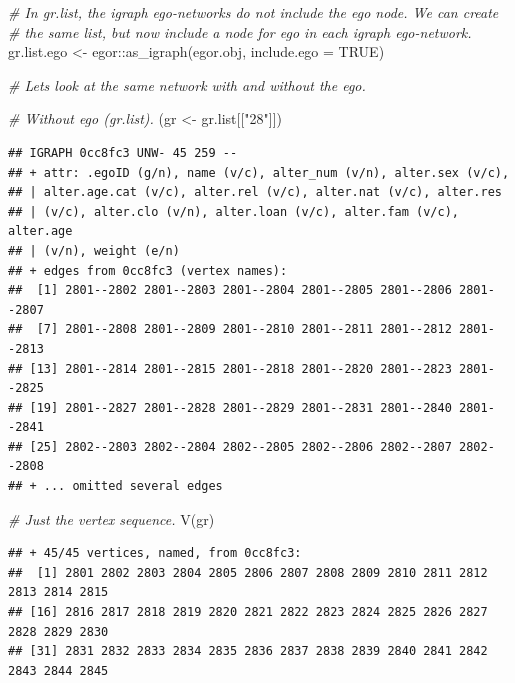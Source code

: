 \documentclass[
]{book}
\newenvironment{Shaded}{\begin{snugshade}}{\end{snugshade}}
\newcommand{\AttributeTok}[1]{\textcolor[rgb]{0.77,0.63,0.00}{#1}}
\newcommand{\CommentTok}[1]{\textcolor[rgb]{0.56,0.35,0.01}{\textit{#1}}}
\newcommand{\ConstantTok}[1]{\textcolor[rgb]{0.00,0.00,0.00}{#1}}
\newcommand{\FunctionTok}[1]{\textcolor[rgb]{0.00,0.00,0.00}{#1}}
\newcommand{\NormalTok}[1]{#1}
\newcommand{\OtherTok}[1]{\textcolor[rgb]{0.56,0.35,0.01}{#1}}
\newcommand{\SpecialCharTok}[1]{\textcolor[rgb]{0.00,0.00,0.00}{#1}}
\newcommand{\StringTok}[1]{\textcolor[rgb]{0.31,0.60,0.02}{#1}}
\begin{document}
\begin{Shaded}
\begin{Highlighting}[]
\CommentTok{\# In gr.list, the igraph ego{-}networks do not include the ego node. We can create}
\CommentTok{\# the same list, but now include a node for ego in each igraph ego{-}network.}
\NormalTok{gr.list.ego }\OtherTok{\textless{}{-}}\NormalTok{ egor}\SpecialCharTok{::}\FunctionTok{as\_igraph}\NormalTok{(egor.obj, }\AttributeTok{include.ego =} \ConstantTok{TRUE}\NormalTok{)}

\CommentTok{\# Let\textquotesingle{}s look at the same network with and without the ego.}

\CommentTok{\# Without ego (gr.list).}
\NormalTok{(gr }\OtherTok{\textless{}{-}}\NormalTok{ gr.list[[}\StringTok{"28"}\NormalTok{]])}
\end{Highlighting}
\end{Shaded}

\begin{verbatim}
## IGRAPH 0cc8fc3 UNW- 45 259 -- 
## + attr: .egoID (g/n), name (v/c), alter_num (v/n), alter.sex (v/c),
## | alter.age.cat (v/c), alter.rel (v/c), alter.nat (v/c), alter.res
## | (v/c), alter.clo (v/n), alter.loan (v/c), alter.fam (v/c), alter.age
## | (v/n), weight (e/n)
## + edges from 0cc8fc3 (vertex names):
##  [1] 2801--2802 2801--2803 2801--2804 2801--2805 2801--2806 2801--2807
##  [7] 2801--2808 2801--2809 2801--2810 2801--2811 2801--2812 2801--2813
## [13] 2801--2814 2801--2815 2801--2818 2801--2820 2801--2823 2801--2825
## [19] 2801--2827 2801--2828 2801--2829 2801--2831 2801--2840 2801--2841
## [25] 2802--2803 2802--2804 2802--2805 2802--2806 2802--2807 2802--2808
## + ... omitted several edges
\end{verbatim}

\begin{Shaded}
\begin{Highlighting}[]
\CommentTok{\# Just the vertex sequence.}
\FunctionTok{V}\NormalTok{(gr)}
\end{Highlighting}
\end{Shaded}

\begin{verbatim}
## + 45/45 vertices, named, from 0cc8fc3:
##  [1] 2801 2802 2803 2804 2805 2806 2807 2808 2809 2810 2811 2812 2813 2814 2815
## [16] 2816 2817 2818 2819 2820 2821 2822 2823 2824 2825 2826 2827 2828 2829 2830
## [31] 2831 2832 2833 2834 2835 2836 2837 2838 2839 2840 2841 2842 2843 2844 2845
\end{verbatim}
\end{document}
